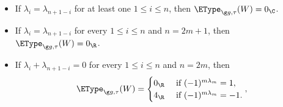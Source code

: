 \documentclass[12pt]{amsart}
\begin{document}
\begin{ex}
\begin{itemize}
\item[(i)] If $\lambda_i=\lambda_{n+1-i}$ for at least one $1\leq i\leq n$, then $\EType_{\g g,\tau}(W)=0_\C$.

\item[(ii)] If $\lambda_i=\lambda_{n+1-i}$ for every $1\leq i\leq n$ and $n=2m+1$, then $\EType_{\g g,\tau}(W)=0_\R$. 
 
\item[(iii)] If $\lambda_i+\lambda_{n+1-i}=0$ for every $1\leq i\leq n$ and $n=2m$, then \[
\EType_{\g g,\tau}(W)=\begin{cases}
0_\R & \text{ if }(-1)^{m\lambda_m}=1,\\
4_\R & \text{ if }(-1)^{m\lambda_m}=-1.
\end{cases},
\] 
 \end{itemize}

\end{ex}
\end{document}

